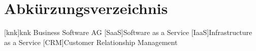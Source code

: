 \documentclass[12pt,bibtotoc]{article}
\newcounter{romanBeginningEnd} %
\begin{document}
    

	
	\setcounter{page}{1} %
	
	\tableofcontents %
	\newpage
	
	\setcounter{secnumdepth}{0} %
	\clearpage
	\listoffigures
	\clearpage
	\newpage
	\section{Abkürzungsverzeichnis}
	\begin{acronym}[LängsteAbkürzung] %
	[knk]{knk Business Software AG}
	[SaaS]{Software as a Service}
	[IaaS]{Infrastructure as a Service}
	[CRM]{Customer Relationship Management}
	\end{acronym}
	\newpage %
	
	\setcounter{secnumdepth}{3} %
	
	\setcounter{romanBeginningEnd}{\the\value{page}} %
	\setcounter{page}{1} %
	
	
	
	
\end{document}
